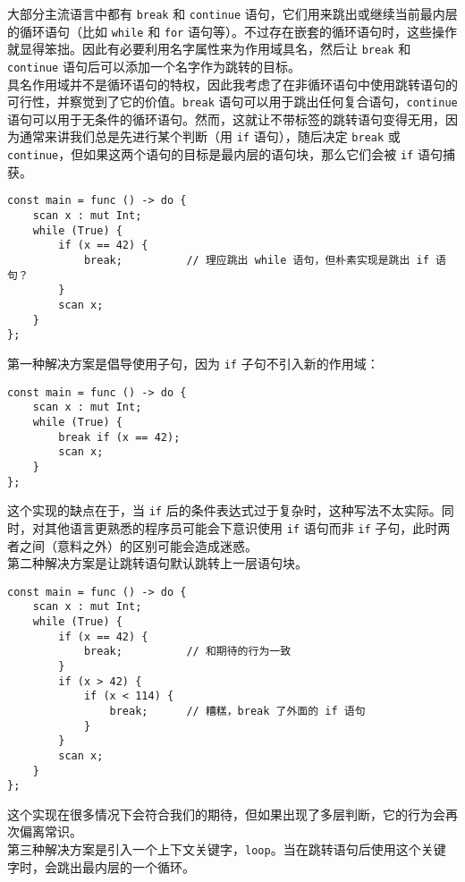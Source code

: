 大部分主流语言中都有 \lstinline!break! 和 \lstinline!continue! 语句，它们用来跳出或继续当前最内层的循环语句（比如 \lstinline!while! 和 \lstinline!for! 语句等）。不过存在嵌套的循环语句时，这些操作就显得笨拙。因此有必要利用名字属性来为作用域具名，然后让 \lstinline!break! 和 \lstinline!continue! 语句后可以添加一个名字作为跳转的目标。 \\

具名作用域并不是循环语句的特权，因此我考虑了在非循环语句中使用跳转语句的可行性，并察觉到了它的价值。\lstinline!break! 语句可以用于跳出任何复合语句，\lstinline!continue! 语句可以用于无条件的循环语句。然而，这就让不带标签的跳转语句变得无用，因为通常来讲我们总是先进行某个判断（用 \lstinline!if! 语句），随后决定 \lstinline!break! 或 \lstinline!continue!，但如果这两个语句的目标是最内层的语句块，那么它们会被 \lstinline!if! 语句捕获。

\begin{lstlisting}
const main = func () -> do {
	scan x : mut Int;
	while (True) {
		if (x == 42) {
			break;			// 理应跳出 while 语句，但朴素实现是跳出 if 语句？
		}
		scan x;
	}
};
\end{lstlisting}

第一种解决方案是倡导使用子句，因为 \lstinline!if! 子句不引入新的作用域：

\begin{lstlisting}
const main = func () -> do {
	scan x : mut Int;
	while (True) {
		break if (x == 42);
		scan x;
	}
};
\end{lstlisting}

这个实现的缺点在于，当 \lstinline!if! 后的条件表达式过于复杂时，这种写法不太实际。同时，对其他语言更熟悉的程序员可能会下意识使用 \lstinline!if! 语句而非 \lstinline!if! 子句，此时两者之间（意料之外）的区别可能会造成迷惑。 \\

第二种解决方案是让跳转语句默认跳转上一层语句块。

\begin{lstlisting}
const main = func () -> do {
	scan x : mut Int;
	while (True) {
		if (x == 42) {
			break;			// 和期待的行为一致
		}
		if (x > 42) {
			if (x < 114) {
				break;		// 糟糕，break 了外面的 if 语句
			}
		}
		scan x;
	}
};
\end{lstlisting}

这个实现在很多情况下会符合我们的期待，但如果出现了多层判断，它的行为会再次偏离常识。 \\

第三种解决方案是引入一个上下文关键字，\lstinline!loop!。当在跳转语句后使用这个关键字时，会跳出最内层的一个循环。

